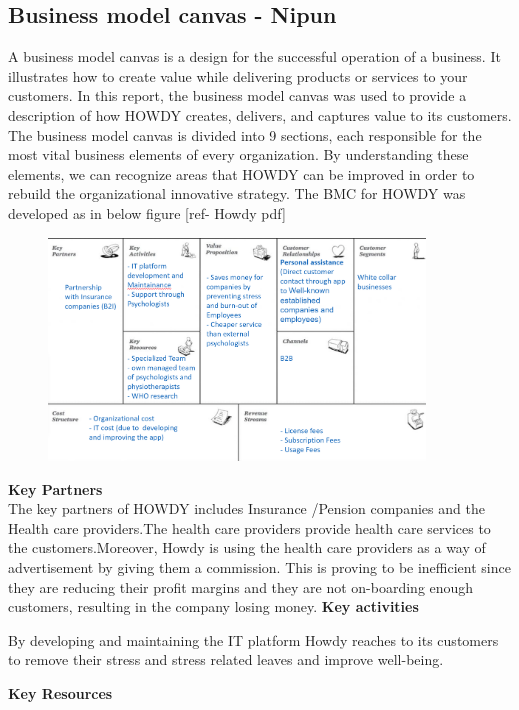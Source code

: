 \subsection{Business model canvas - Nipun}
A business model canvas is a design for the successful operation of a business. It illustrates how to create value while delivering products or services to your customers. In this report, the business model canvas was used to provide a description of how HOWDY creates, delivers, and captures value to its customers. The business model canvas is divided into 9 sections, each responsible for the most vital business elements of every organization. By understanding these elements, we can recognize areas that HOWDY can be improved in order to rebuild the organizational innovative strategy. The BMC for HOWDY was developed as in below figure [ref- Howdy pdf]\\

\begin{figure}[H]
\includegraphics[width=10cm]{figures/BCDRAFT.png}
\centering
\end{figure}

\noindent \textbf{Key Partners}\\
\noindent The key partners of HOWDY includes Insurance /Pension companies and the Health care providers.The health care providers provide health care services to the customers.Moreover, Howdy is using the health care providers as a way of advertisement by giving them a commission. This is proving to be inefficient since they are reducing their profit margins and they are not on-boarding enough customers, resulting in the company losing money.
\noindent \textbf{Key activities}

\noindent By developing and maintaining the IT platform Howdy reaches to its customers to remove their stress and stress related leaves and improve well-being.

\noindent \textbf{Key Resources}

